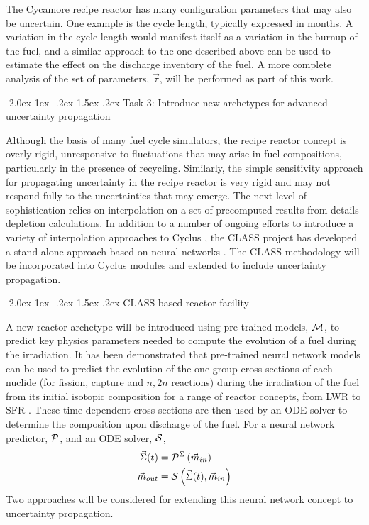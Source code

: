 \documentclass[dvips,11pt]{article}
\makeatletter
\renewcommand\subsection{\@startsection{subsection}{2}{\z@}%
                                     {-2.0ex\@plus -1ex \@minus -.2ex}%
                                     {1.5ex \@plus .2ex}%
                                     {\normalfont\bfseries}}%
\renewcommand\subsubsection{\@startsection{subsubsection}{3}{\z@}%
                                     {-2.0ex\@plus -1ex \@minus -.2ex}%
                                     {1.5ex \@plus .2ex}%
                                     {\normalfont\bfseries}}%
\makeatother
\begin{document}
The Cycamore recipe reactor has many configuration
parameters that may also be uncertain.  One
example is the cycle length, typically expressed
in months.  A variation in the cycle length would
manifest itself as a variation in the burnup of
the fuel, and a similar approach to the one
described above can be used to estimate the effect
on the discharge inventory of the fuel.  A more
complete analysis of the set of parameters,
$\vec{\tau}$, will be performed as part of this work.

\subsection{Task 3: Introduce new archetypes for advanced uncertainty propagation}

Although the basis of many fuel cycle simulators,
the recipe reactor concept is overly rigid,
unresponsive to fluctuations that may arise in fuel
compositions, particularly in the presence of
recycling.  Similarly, the simple sensitivity
approach for propagating uncertainty in the recipe
reactor is very rigid and may not respond fully to
the uncertainties that may emerge.  The next level
of sophistication relies on interpolation on a set
of precomputed results from details depletion
calculations.  In addition to a number of ongoing
efforts to introduce a variety of interpolation
approaches to Cyclus \cite{brightlite, cyborg}, the
CLASS project\cite{CLASS} has developed a
stand-alone approach based on neural networks \cite{Leniau.ANE.2015}. The
CLASS methodology will be incorporated into Cyclus
modules and extended to include uncertainty
propagation.

\subsubsection{CLASS-based reactor facility} \label{sec:reactors}

A new reactor archetype will be introduced using
pre-trained models, ${\cal M}$, to predict key
physics parameters needed to compute the evolution
of a fuel during the irradiation. It has been
demonstrated that pre-trained neural network
models can be used to predict the evolution of the
one group cross sections of each nuclide (for
fission, capture and $n,2n$ reactions) during the
irradiation of the fuel from its initial isotopic
composition for a range of reactor concepts, from
LWR to SFR \cite{Leniau.ANE.2015, Leniau.PHYSOR.2016}.
These time-dependent cross sections are then used
by an ODE solver to determine the composition upon
discharge of the fuel.  For a neural network
predictor, ${\cal P}$, and an ODE solver, ${\cal S}$,
\begin{align}
  \vec{\Sigma}(t) &= {\cal P}^{\Sigma}\left( \vec{m}_{in}\right)\\
  \vec{m}_{out} &= {\cal S}\left( \vec{\Sigma}(t), \vec{m}_{in}\right)
\end{align}
Two approaches will be considered for extending
this neural network concept to uncertainty
propagation.
\end{document}
